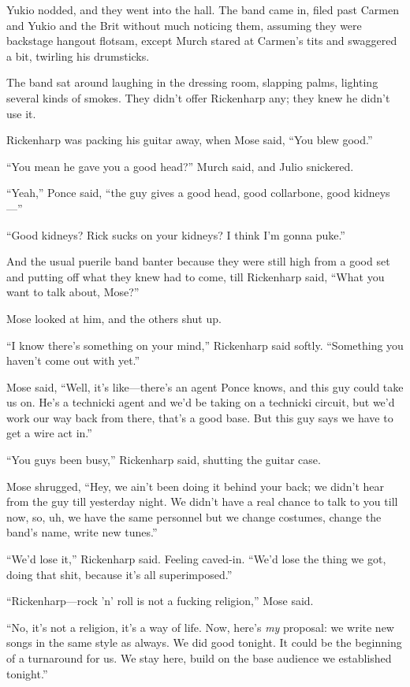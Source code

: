 Yukio nodded, and they went into the hall. The band came in, filed past Carmen and Yukio and the Brit without much noticing them, assuming they were backstage hangout flotsam, except Murch stared at Carmen's tits and swaggered a bit, twirling his drumsticks.

The band sat around laughing in the dressing room, slapping palms, lighting several kinds of smokes. They didn't offer Rickenharp any; they knew he didn't use it.

Rickenharp was packing his guitar away, when Mose said, ``You blew good.''

``You mean he gave you a good head?'' Murch said, and Julio snickered.

``Yeah,'' Ponce said, ``the guy gives a good head, good collarbone, good kidneys---''

``Good kidneys? Rick sucks on your kidneys? I think I'm gonna puke.''

And the usual puerile band banter because they were still high from a good set and putting off what they knew had to come, till Rickenharp said, ``What you want to talk about, Mose?''

Mose looked at him, and the others shut up.

``I know there's something on your mind,'' Rickenharp said softly. ``Something you haven't come out with yet.''

Mose said, ``Well, it's like---there's an agent Ponce knows, and this guy could take us on. He's a technicki agent and we'd be taking on a technicki circuit, but we'd work our way back from there, that's a good base. But this guy says we have to get a wire act in.''

``You guys been busy,'' Rickenharp said, shutting the guitar case.

Mose shrugged, ``Hey, we ain't been doing it behind your back; we didn't hear from the guy till yesterday night. We didn't have a real chance to talk to you till now, so, uh, we have the same personnel but we change costumes, change the band's name, write new tunes.''

``We'd lose it,'' Rickenharp said. Feeling caved-in. ``We'd lose the thing we got, doing that shit, because it's all superimposed.''

``Rickenharp---rock 'n' roll is not a fucking religion,'' Mose said.

``No, it's not a religion, it's a way of life. Now, here's \textit{my} proposal: we write new songs in the same style as always. We did good tonight. It could be the beginning of a turnaround for us. We stay here, build on the base audience we established tonight.''

